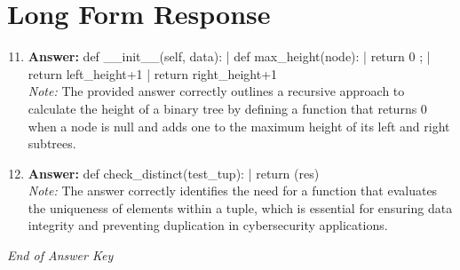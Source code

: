 \documentclass[12pt]{article}
\begin{document}
\section*{Long Form Response}
\begin{enumerate}[label=\arabic*.]
\setcounter{enumi}{10}
\item \textbf{Answer:} def \_\_init\_\_(self, data): | def max\_height(node): | return 0 ; | return left\_height+1 | return right\_height+1
\\ \textit{Note:} The provided answer correctly outlines a recursive approach to calculate the height of a binary tree by defining a function that returns 0 when a node is null and adds one to the maximum height of its left and right subtrees.
\item \textbf{Answer:} def check\_distinct(test\_tup): | return (res)
\\ \textit{Note:} The answer correctly identifies the need for a function that evaluates the uniqueness of elements within a tuple, which is essential for ensuring data integrity and preventing duplication in cybersecurity applications.
\end{enumerate}

\vfill
\noindent\textit{End of Answer Key}
\end{document}
